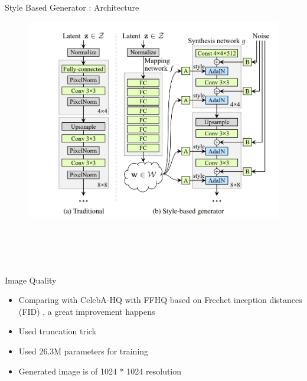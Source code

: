 \begin{frame}[fragile]{Style Based Generator : Architecture}
     \begin{figure}[ht]
         \hspace*{-1cm}\includegraphics[width=0.9\linewidth]{styleganarchitecture.png} \\ \\ \\ \\ \\
    \end{figure}
\end{frame}

\begin{frame}[fragile]{Image Quality }
        \begin{itemize}
        \item Comparing with CelebA-HQ with FFHQ based on Frechet inception distances (FID) , a great improvement happens
        \item Used truncation trick
        \item Used 26.3M parameters for training
        \item Generated image is of 1024 * 1024 resolution
    \end{itemize}

\end{frame}



